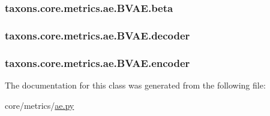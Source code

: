 \subsubsection[{\texorpdfstring{beta}{beta}}]{\setlength{\rightskip}{0pt plus 5cm}taxons.\+core.\+metrics.\+ae.\+B\+V\+A\+E.\+beta}\hypertarget{classtaxons_1_1core_1_1metrics_1_1ae_1_1_b_v_a_e_a96e637c04b2836c80c082c0b5cea6bc7}{}\label{classtaxons_1_1core_1_1metrics_1_1ae_1_1_b_v_a_e_a96e637c04b2836c80c082c0b5cea6bc7}
\subsubsection[{\texorpdfstring{decoder}{decoder}}]{\setlength{\rightskip}{0pt plus 5cm}taxons.\+core.\+metrics.\+ae.\+B\+V\+A\+E.\+decoder}\hypertarget{classtaxons_1_1core_1_1metrics_1_1ae_1_1_b_v_a_e_afab0746bbe6ff3bac9e578e867c5f8d5}{}\label{classtaxons_1_1core_1_1metrics_1_1ae_1_1_b_v_a_e_afab0746bbe6ff3bac9e578e867c5f8d5}
\subsubsection[{\texorpdfstring{encoder}{encoder}}]{\setlength{\rightskip}{0pt plus 5cm}taxons.\+core.\+metrics.\+ae.\+B\+V\+A\+E.\+encoder}\hypertarget{classtaxons_1_1core_1_1metrics_1_1ae_1_1_b_v_a_e_a4466c434a224f88d518c194bcdb87a3a}{}\label{classtaxons_1_1core_1_1metrics_1_1ae_1_1_b_v_a_e_a4466c434a224f88d518c194bcdb87a3a}


The documentation for this class was generated from the following file\+:\begin{DoxyCompactItemize}
\item 
core/metrics/\hyperlink{ae_8py}{ae.\+py}\end{DoxyCompactItemize}
